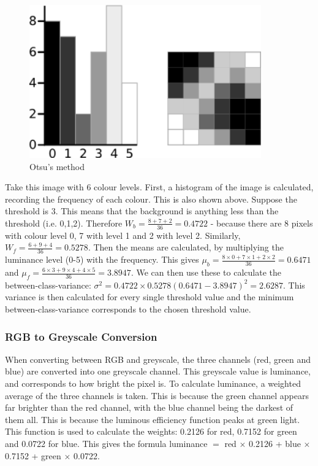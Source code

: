 \documentclass[titlepage]{article}
\begin{document}
\begin{figure}[H]
  \centering
  \includegraphics[width=10cm]{otsuOrig.png}
  \caption{Otsu's method}
  \label{fig:boat1}
\end{figure}

Take this image with 6 colour levels. First, a histogram of the image is calculated, recording the frequency of each colour. This is also shown above. Suppose the threshold is 3. This means that the background is anything less than the threshold (i.e. 0,1,2). Therefore $W_b = \frac{8+7+2}{36} = 0.4722$ - because there are 8 pixels with colour level 0, 7 with level 1 and 2 with level 2. Similarly, $W_f = \frac{6+9+4}{36} = 0.5278$. Then the means are calculated, by multiplying the luminance level (0-5) with the frequency. This gives $\mu_b = \frac{8 \times 0 + 7 \times 1 + 2 \times 2}{36} = 0.6471$ and $\mu_f = \frac{6 \times 3 + 9 \times 4 + 4 \times 5}{36} = 3.8947$. We can then use these to calculate the between-class-variance: $\sigma^2 = 0.4722 \times 0.5278 (0.6471 - 3.8947)^2 = 2.6287$. This variance is then calculated for every single threshold value and the minimum between-class-variance corresponds to the chosen threshold value.

\subsubsection{RGB to Greyscale Conversion}
When converting between RGB and greyscale, the three channels (red, green and blue) are converted into one greyscale channel. This greyscale value is luminance, and corresponds to how bright the pixel is. To calculate luminance, a weighted average of the three channels is taken. This is because the green channel appears far brighter than the red channel, with the blue channel being the darkest of them all. This is because the luminous efficiency function peaks at green light. This function is used to calculate the weights: 0.2126 for red, 0.7152 for green and 0.0722 for blue. This gives the formula luminance $=$ red $\times$ 0.2126 + blue $\times$ 0.7152 + green $\times$ 0.0722. 
\end{document}
